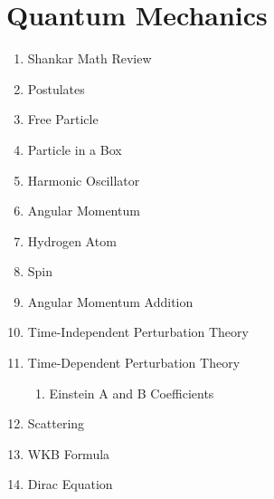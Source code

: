 \documentclass[12pt]{extarticle}
\begin{document}
\section{Quantum Mechanics}
\begin{enumerate}
  \item{Shankar Math Review}
  \item{Postulates}
  \item{Free Particle}
  \item{Particle in a Box}
  \item{Harmonic Oscillator}
  \item{Angular Momentum}
  \item{Hydrogen Atom}
  \item{Spin}
  \item{Angular Momentum Addition}
  \item{Time-Independent Perturbation Theory}
  \item{Time-Dependent Perturbation Theory}
  \begin{enumerate}
    \item{Einstein A and B Coefficients}
  \end{enumerate}
  \item{Scattering}
  \item{WKB Formula}
  \item{Dirac Equation}
\end{enumerate}
\end{document}
